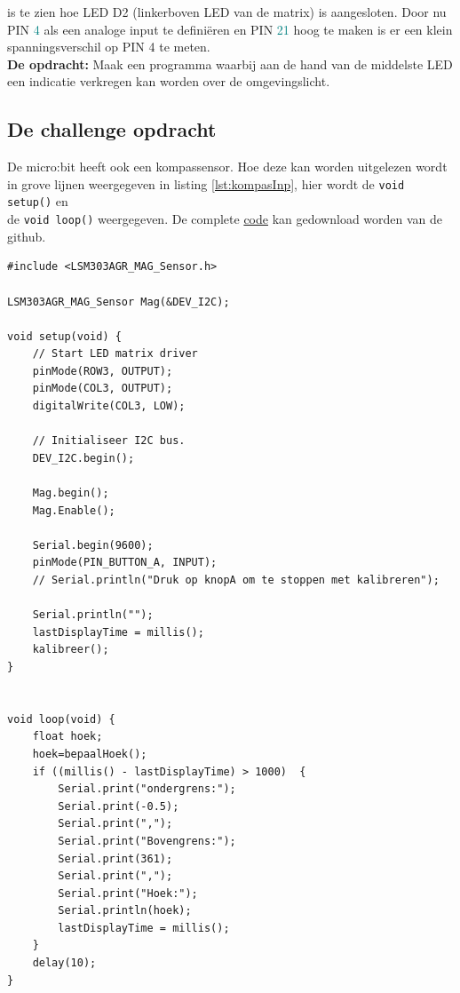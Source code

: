 \begin{enumerate}
\begin{figure}[h!]
	\end{figure}
	
	is te zien hoe LED D2 (linkerboven LED van de matrix) is aangesloten. Door nu PIN \textcolor{teal}{4} als een analoge input te definiëren en PIN \textcolor{teal}{21} hoog te maken is er een klein spanningsverschil op PIN 4 te meten.\\
	
    \textbf{De opdracht:} Maak een programma waarbij aan de hand van de middelste LED een indicatie verkregen kan worden over de omgevingslicht.
   
   \subsection{De challenge opdracht}
   
   De micro:bit heeft ook een kompassensor. Hoe deze kan worden uitgelezen wordt in grove lijnen weergegeven in listing \ref{lst:kompasInp}, hier wordt de \lstinline|void setup()| en\\ de  \lstinline|void loop()| weergegeven. De complete \href{https://github.com/JohnVi-hhs/embsysP/blob/main/voorbeelden/kompasOpdracht.ino}{code} kan gedownload worden van de github.
   	\begin{lstlisting}[caption= De micro:bit als een kompas,label={lst:kompasInp}]
#include <LSM303AGR_MAG_Sensor.h>

LSM303AGR_MAG_Sensor Mag(&DEV_I2C);
   		
void setup(void) {
	// Start LED matrix driver
	pinMode(ROW3, OUTPUT);
	pinMode(COL3, OUTPUT);
	digitalWrite(COL3, LOW);
	
	// Initialiseer I2C bus.
	DEV_I2C.begin();
	
	Mag.begin();
	Mag.Enable();
	
	Serial.begin(9600);
	pinMode(PIN_BUTTON_A, INPUT);
	// Serial.println("Druk op knopA om te stoppen met kalibreren");
	
	Serial.println("");
	lastDisplayTime = millis();
	kalibreer();
}

   		
void loop(void) {
	float hoek;
	hoek=bepaalHoek();
	if ((millis() - lastDisplayTime) > 1000)  {
		Serial.print("ondergrens:");
		Serial.print(-0.5);
		Serial.print(",");
		Serial.print("Bovengrens:");
		Serial.print(361);
		Serial.print(",");
		Serial.print("Hoek:");
		Serial.println(hoek);
		lastDisplayTime = millis();
	}
	delay(10);
}
   		
 
\end{lstlisting}
     

\end{enumerate}
